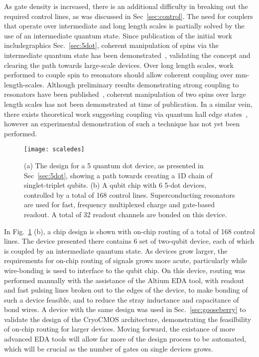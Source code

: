 As gate density is increased, there is an additional difficulty in breaking out the required control lines, as was discussed in Sec~\ref{sec:control}. The need for
couplers that operate over intermediate and long length scales is partially solved by the use of an intermediate quantum state. Since publication of the initial work includegraphics
Sec.~\ref{sec:5dot}, coherent manipulation of spins via the intermediate quantum state has been demonstrated~\cite{s41467-019-09194-x}, validating the concept
and clearing the path towards large-scale devices. Over long length scales, work performed to couple spin to resonators should allow coherent coupling over
\si{\milli\meter}-length-scales. Although preliminary results demonstrating strong coupling to resonators have been published~\cite{nature11559,2019arXiv190500776B},
coherent manipulation of two spins over large length scales has not been demonstrated at time of publication. In a similar vein, there exists theoretical work suggesting
coupling via quantum hall edge states~\cite{dohertyqhe}, however an experimental demonstration of such a technique has not yet been performed.

\begin{figure}
    \texttt{[image: scaledes]}
    \caption[Scaleable qubit designs]{\label{fig:scaledes} (a) The design for a 5 quantum dot device, as presented in Sec~\ref{sec:5dot}, showing a path towards creating a 1D
    chain of singlet-triplet qubits. (b) A qubit chip with 6 5-dot devices, controlled by a total of 168 control lines. Superconducting resonators are used for fast, frequency
    multiplexed charge and gate-based readout. A total of 32 readout channels are bonded on this device.}
\end{figure}

In Fig.~\ref{fig:scaledes} (b), a chip design is shown with on-chip routing of a total of 168 control lines. The device presented there contains 6 set of two-qubit device,
each of which is coupled by an intermediate quantum state. As devices grow larger, the requirements for on-chip routing of signals grows more acute, particularly
while wire-bonding is used to interface to the qubit chip. On this device, routing was performed manually with the assistance of the Altium EDA tool, with readout and
fast pulsing lines broken out to the edges of the device, to make bonding of such a device feasible, and to reduce the stray inductance and capacitance of bond wires.
A device with the same design was used in Sec.~\ref{sec:gooseberry} to validate the design of the CryoCMOS architecture, demonstrating the feasilbility of on-chip routing
for larger devices. Moving forward, the existance of more advanced EDA tools will allow far more of the design process to be automated, which will be crucial as the
number of gates on single devices grows.



